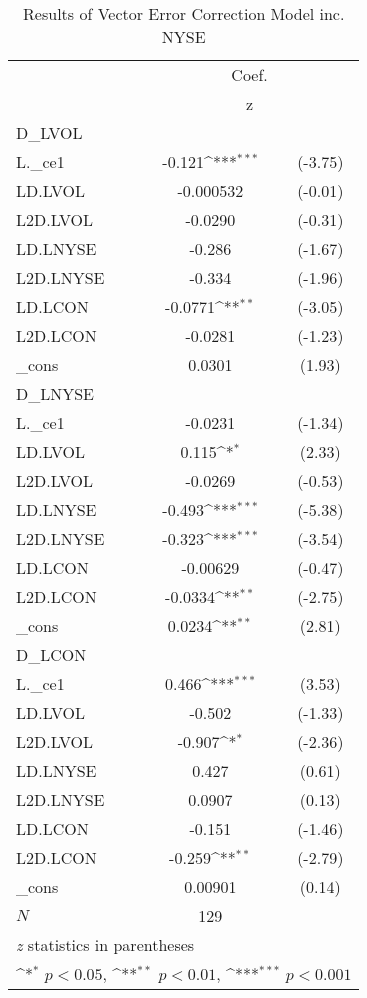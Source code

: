 \begin{table}
\begin{center}
\caption[VECM Results w/ NYSE Volume]{Results of Vector Error Correction Model inc. NYSE\label{vec2}}
\vspace{0.3in}
{
\def\sym#1{\ifmmode^{#1}\else\(^{#1}\)\fi}
\begin{tabular}{l*{1}{cc}}
\hline\hline
          &\multicolumn{2}{c}{Coef.}     \\
          &\multicolumn{2}{c}{z}        \\
\hline
D\_LVOL    &                  &         \\
L.\_ce1    &   -0.121\sym{***}&  (-3.75)\\
LD.LVOL   &-0.000532         &  (-0.01)\\
L2D.LVOL  &  -0.0290         &  (-0.31)\\
LD.LNYSE&   -0.286         &  (-1.67)\\
L2D.LNYSE&   -0.334         &  (-1.96)\\
LD.LCON   &  -0.0771\sym{**} &  (-3.05)\\
L2D.LCON  &  -0.0281         &  (-1.23)\\
\_cons    &   0.0301         &   (1.93)\\
\hline
D\_LNYSE&                  &         \\
L.\_ce1    &  -0.0231         &  (-1.34)\\
LD.LVOL   &    0.115\sym{*}  &   (2.33)\\
L2D.LVOL  &  -0.0269         &  (-0.53)\\
LD.LNYSE&   -0.493\sym{***}&  (-5.38)\\
L2D.LNYSE&   -0.323\sym{***}&  (-3.54)\\
LD.LCON   & -0.00629         &  (-0.47)\\
L2D.LCON  &  -0.0334\sym{**} &  (-2.75)\\
\_cons    &   0.0234\sym{**} &   (2.81)\\
\hline
D\_LCON    &                  &         \\
L.\_ce1    &    0.466\sym{***}&   (3.53)\\
LD.LVOL   &   -0.502         &  (-1.33)\\
L2D.LVOL  &   -0.907\sym{*}  &  (-2.36)\\
LD.LNYSE&    0.427         &   (0.61)\\
L2D.LNYSE&   0.0907         &   (0.13)\\
LD.LCON   &   -0.151         &  (-1.46)\\
L2D.LCON  &   -0.259\sym{**} &  (-2.79)\\
\_cons    &  0.00901         &   (0.14)\\
\hline
\(N\)     &      129         &         \\
\hline\hline
\multicolumn{3}{l}{\footnotesize \textit{z} statistics in parentheses}\\
\multicolumn{3}{l}{\footnotesize \sym{*} \(p<0.05\), \sym{**} \(p<0.01\), \sym{***} \(p<0.001\)}\\
\end{tabular}
}

\end{center}
\end{table}

